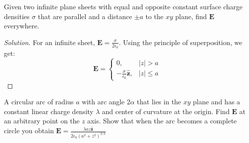\documentclass[crop=false,class=article,oneside]{standalone}
\begin{document}
    \begin{problem}[Wangsness 3-9]
        Given two infinite plane sheets with equal and opposite
        constant surface charge densities $\sigma$ that are
        parallel and a distance $\pm a$ to the $xy$ plane,
        find $\mathbf{E}$ everywhere.
    \end{problem}
    \begin{proof}[Solution]
        For an infinite sheet,
        $\mathbf{E}=\frac{\sigma}{2\epsilon_{0}}$.
        Using the principle of superposition, we get:
        \begin{equation*}
            \mathbf{E}=
            \begin{cases}
                0,
                &|z|>a\\
                -\frac{\sigma}
                      {\epsilon_{0}}\hat{\mathbf{z}},
                &|z|\leq{a}
            \end{cases}
        \end{equation*}
    \end{proof}
    \begin{problem}[Wangsness 3-10]
        A circular arc of radius $a$ with arc angle $2\alpha$
        that lies in the $xy$ plane and has a constant linear
        charge density $\lambda$ and center of curvature at
        the origin. Find $\mathbf{E}$ at an arbitrary point
        on the $z$ axis. Show that when the arc becomes a
        complete circle you obtain
        $\mathbf{E}%
         =\frac{\lambda{az}\hat{\mathbf{z}}}%
               {2\epsilon_{0}(a^{2}+z^{2})^{3/2}}$
    \end{problem}
\end{document}
